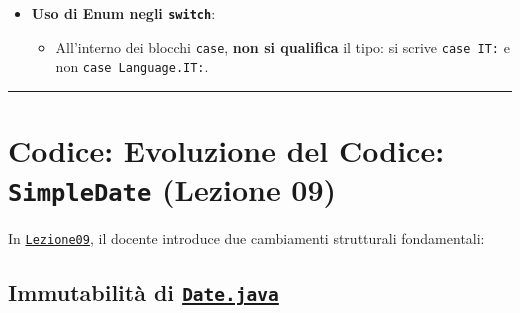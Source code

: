 \documentclass[11pt,a4paper,oneside]{report}
\newcommand{\passthrough}[1]{#1}
\providecommand{\tightlist}{\setlength{\itemsep}{0pt}\setlength{\parskip}{0pt}}
\begin{document}
\begin{itemize}
  \begin{itemize}
  \tightlist
  \item
    La JVM garantisce che in memoria esista \textbf{una e una sola
    istanza} per ciascuna costante di un enum (\emph{garanzia di unicità
    singleton}).
  \item
    Pertanto, il confronto con \textbf{\passthrough{\lstinline!==!}} è
    perfettamente sicuro ed è \textbf{più robusto di
    \passthrough{\lstinline!.equals()!}}: se una variabile vale
    \passthrough{\lstinline!null!}, l'espressione
    \passthrough{\lstinline!move == Direction.WEST!} restituisce
    \passthrough{\lstinline!false!} senza errori, mentre
    \passthrough{\lstinline!move.equals(...)!} causerebbe un crash con
    \passthrough{\lstinline!NullPointerException!}!
  \end{itemize}
\item
  \textbf{Uso di Enum negli \passthrough{\lstinline!switch!}}:

  \begin{itemize}
  \tightlist
  \item
    All'interno dei blocchi \passthrough{\lstinline!case!}, \textbf{non
    si qualifica} il tipo: si scrive \passthrough{\lstinline!case IT:!}
    e non \passthrough{\lstinline!case Language.IT:!}.
  \end{itemize}
\end{itemize}

\begin{center}\rule{0.5\linewidth}{0.5pt}\end{center}

\section{\texorpdfstring{Codice: Evoluzione del Codice:
\texttt{SimpleDate} (Lezione
09)}{Codice: Evoluzione del Codice: SimpleDate (Lezione 09)}}\label{chap08_codice-evoluzione-del-codice-simpledate-lezione-09}

In
\href{file:///home/wally/Documenti/GitHub/Programmazione-II/25-26/Teoria-e-Esercitazioni/Codice-20260902/Lezione09/SimpleDate/src}{\passthrough{\lstinline!Lezione09!}},
il docente introduce due cambiamenti strutturali fondamentali:

\subsection{\texorpdfstring{Immutabilità di
\href{file:///home/wally/Documenti/GitHub/Programmazione-II/25-26/Teoria-e-Esercitazioni/Codice-20260902/Lezione09/SimpleDate/src/Date.java}{\texttt{Date.java}}}{Immutabilità di Date.java}}\label{chap08_immutabilituxe0-di-date.java}
\end{document}
